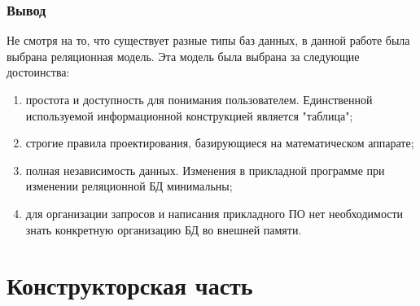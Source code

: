\documentclass[a4paper, 10pt]{article}
\begin{document}
	\subsubsection{Вывод}
	\hspace*{5mm} Не смотря на то, что существует разные типы баз данных, в данной работе была выбрана реляционная модель. Эта модель была выбрана за следующие достоинства:
	\begin{enumerate}
		\item простота и доступность для понимания пользователем. Единственной используемой информационной конструкцией является "таблица";
		\item строгие правила проектирования, базирующиеся на математическом аппарате;
		\item полная независимость данных. Изменения в прикладной программе при изменении реляционной БД минимальны;
		\item для организации запросов и написания прикладного ПО нет необходимости знать конкретную организацию БД во внешней памяти. 
	\end{enumerate}
\clearpage
\newpage
\section{Конструкторская часть}
\end{document}
